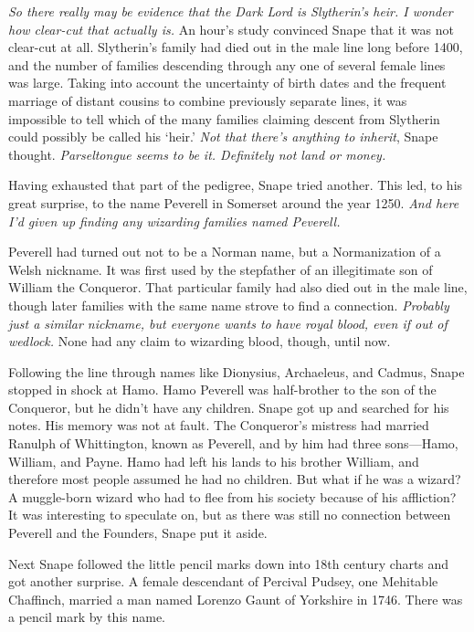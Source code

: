 \emph{So there really may be evidence that the Dark Lord is Slytherin's heir. I wonder how clear-cut that actually is.} An hour's study convinced Snape that it was not clear-cut at all. Slytherin's family had died out in the male line long before 1400, and the number of families descending through any one of several female lines was large. Taking into account the uncertainty of birth dates and the frequent marriage of distant cousins to combine previously separate lines, it was impossible to tell which of the many families claiming descent from Slytherin could possibly be called his `heir.' \emph{Not that there's anything to inherit}, Snape thought. \emph{Parseltongue seems to be it. Definitely not land or money.}

Having exhausted that part of the pedigree, Snape tried another. This led, to his great surprise, to the name Peverell in Somerset around the year 1250. \emph{And here I'd given up finding any wizarding families named Peverell.}

Peverell had turned out not to be a Norman name, but a Normanization of a Welsh nickname. It was first used by the stepfather of an illegitimate son of William the Conqueror. That particular family had also died out in the male line, though later families with the same name strove to find a connection. \emph{Probably just a similar nickname, but everyone wants to have royal blood, even if out of wedlock.} None had any claim to wizarding blood, though, until now.

Following the line through names like Dionysius, Archaeleus, and Cadmus, Snape stopped in shock at Hamo. Hamo Peverell was half-brother to the son of the Conqueror, but he didn't have any children. Snape got up and searched for his notes. His memory was not at fault. The Conqueror's mistress had married Ranulph of Whittington, known as Peverell, and by him had three sons—Hamo, William, and Payne. Hamo had left his lands to his brother William, and therefore most people assumed he had no children. But what if he was a wizard? A muggle-born wizard who had to flee from his society because of his affliction? It was interesting to speculate on, but as there was still no connection between Peverell and the Founders, Snape put it aside.

Next Snape followed the little pencil marks down into 18th century charts and got another surprise. A female descendant of Percival Pudsey, one Mehitable Chaffinch, married a man named Lorenzo Gaunt of Yorkshire in 1746. There was a pencil mark by this name.

